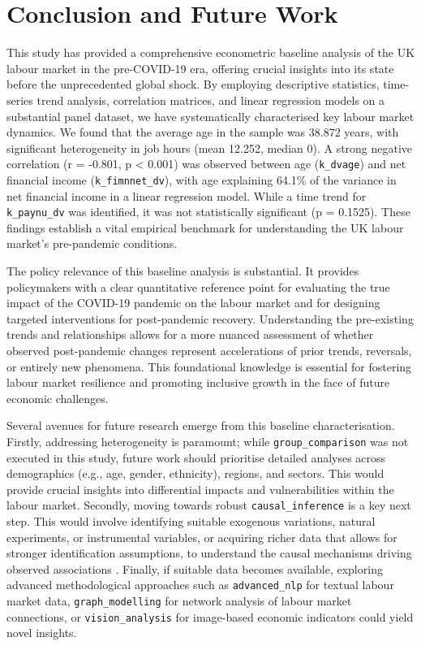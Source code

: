\documentclass[11pt,a4paper]{article}
\begin{document}
\section{Conclusion and Future Work}

This study has provided a comprehensive econometric baseline analysis of the UK labour market in the pre-COVID-19 era, offering crucial insights into its state before the unprecedented global shock. By employing descriptive statistics, time-series trend analysis, correlation matrices, and linear regression models on a substantial panel dataset, we have systematically characterised key labour market dynamics. We found that the average age in the sample was 38.872 years, with significant heterogeneity in job hours (mean 12.252, median 0). A strong negative correlation (r = -0.801, p < 0.001) was observed between age (\texttt{k\_dvage}) and net financial income (\texttt{k\_fimnnet\_dv}), with age explaining 64.1\% of the variance in net financial income in a linear regression model. While a time trend for \texttt{k\_paynu\_dv} was identified, it was not statistically significant (p = 0.1525). These findings establish a vital empirical benchmark for understanding the UK labour market's pre-pandemic conditions.

The policy relevance of this baseline analysis is substantial. It provides policymakers with a clear quantitative reference point for evaluating the true impact of the COVID-19 pandemic on the labour market and for designing targeted interventions for post-pandemic recovery. Understanding the pre-existing trends and relationships allows for a more nuanced assessment of whether observed post-pandemic changes represent accelerations of prior trends, reversals, or entirely new phenomena. This foundational knowledge is essential for fostering labour market resilience and promoting inclusive growth in the face of future economic challenges.

Several avenues for future research emerge from this baseline characterisation. Firstly, addressing heterogeneity is paramount; while \texttt{group\_comparison} was not executed in this study, future work should prioritise detailed analyses across demographics (e.g., age, gender, ethnicity), regions, and sectors. This would provide crucial insights into differential impacts and vulnerabilities within the labour market. Secondly, moving towards robust \texttt{causal\_inference} is a key next step. This would involve identifying suitable exogenous variations, natural experiments, or instrumental variables, or acquiring richer data that allows for stronger identification assumptions, to understand the causal mechanisms driving observed associations \cite{ref2}. Finally, if suitable data becomes available, exploring advanced methodological approaches such as \texttt{advanced\_nlp} for textual labour market data, \texttt{graph\_modelling} for network analysis of labour market connections, or \texttt{vision\_analysis} for image-based economic indicators could yield novel insights.
\end{document}
